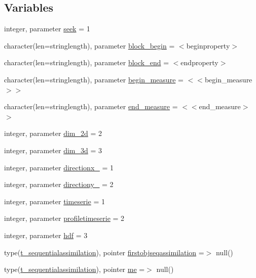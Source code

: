 \subsection*{Variables}
\begin{DoxyCompactItemize}
\item 
integer, parameter \mbox{\hyperlink{namespacemodulesequentialassimilation_a6bfe22e83fbd61cf96b89f47b9c5457d}{seek}} = 1
\item 
character(len=stringlength), parameter \mbox{\hyperlink{namespacemodulesequentialassimilation_ad4132c410b5be746f6b8bde4d0189f58}{block\+\_\+begin}} = \textquotesingle{}$<$beginproperty$>$\textquotesingle{}
\item 
character(len=stringlength), parameter \mbox{\hyperlink{namespacemodulesequentialassimilation_a0ebbde5c40726c4eca6067a14224a1e3}{block\+\_\+end}} = \textquotesingle{}$<$endproperty$>$\textquotesingle{}
\item 
character(len=stringlength), parameter \mbox{\hyperlink{namespacemodulesequentialassimilation_a77da16ccbaea28106a79c214310680da}{begin\+\_\+measure}} = \textquotesingle{}$<$$<$begin\+\_\+measure$>$$>$\textquotesingle{}
\item 
character(len=stringlength), parameter \mbox{\hyperlink{namespacemodulesequentialassimilation_a8d0203558728a88dd0a053f23e6c74b7}{end\+\_\+measure}} = \textquotesingle{}$<$$<$end\+\_\+measure$>$$>$\textquotesingle{}
\item 
integer, parameter \mbox{\hyperlink{namespacemodulesequentialassimilation_a48f688b3f14326b500dfd683d18bd069}{dim\+\_\+2d}} = 2
\item 
integer, parameter \mbox{\hyperlink{namespacemodulesequentialassimilation_aad55b299403480a62edd2b52abc58065}{dim\+\_\+3d}} = 3
\item 
integer, parameter \mbox{\hyperlink{namespacemodulesequentialassimilation_aa961250cecdb6e41645fbc89696d9fdd}{directionx\+\_\+}} = 1
\item 
integer, parameter \mbox{\hyperlink{namespacemodulesequentialassimilation_a1e47dbaf200f3d3d8d5d05f73c786294}{directiony\+\_\+}} = 2
\item 
integer, parameter \mbox{\hyperlink{namespacemodulesequentialassimilation_af1500c1b270c95ca463c500d6af31177}{timeserie}} = 1
\item 
integer, parameter \mbox{\hyperlink{namespacemodulesequentialassimilation_a9f871dcd1917128408934c12201b788f}{profiletimeserie}} = 2
\item 
integer, parameter \mbox{\hyperlink{namespacemodulesequentialassimilation_af5f287d70e177aabed0e646fcd67dd61}{hdf}} = 3
\item 
type(\mbox{\hyperlink{structmodulesequentialassimilation_1_1t__sequentialassimilation}{t\+\_\+sequentialassimilation}}), pointer \mbox{\hyperlink{namespacemodulesequentialassimilation_a056c2a02f7b1564811985bd04900793f}{firstobjseqassimilation}} =$>$ null()
\item 
type(\mbox{\hyperlink{structmodulesequentialassimilation_1_1t__sequentialassimilation}{t\+\_\+sequentialassimilation}}), pointer \mbox{\hyperlink{namespacemodulesequentialassimilation_afebfebdaf1bfbc40b82684dd17f50357}{me}} =$>$ null()
\end{DoxyCompactItemize}


